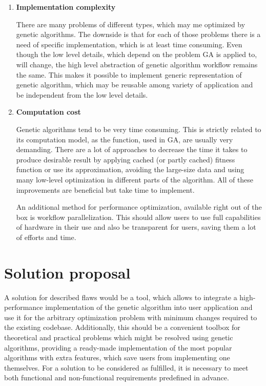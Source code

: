 \begin{enumerate}
\item \textbf{Implementation complexity}

There are many problems of different types, which may me optimized by genetic algorithms. The downside is that for each of those problems there is a need of specific implementation, which is at least time consuming. Even though the low level details, which depend on the problem GA is applied to, will change, the high level abstraction of genetic algorithm workflow remains the same. This makes it possible to implement generic representation of genetic algorithm, which may be reusable among variety of application and be independent from the low level details. 
\medbreak

\item \textbf{Computation cost}

Genetic algorithms tend to be very time consuming. This is strictly related to its computation model, as the function, used in GA, are usually very demanding. There are a lot of approaches to decrease the time it takes to produce desirable result by applying cached (or partly cached) fitness function or use its approximation, avoiding the large-size data and using many low-level optimization in different parts of the algorithm. All of these improvements are beneficial but take time to implement.

An additional method for performance optimization, available right out of the box is workflow parallelization. This should allow users to use full capabilities of hardware in their use and also be transparent for users, saving them a lot of efforts and time.
\medbreak

\end{enumerate}

\section{Solution proposal}

A solution for described flaws would be a tool, which allows to integrate a high-performance implementation of the genetic algorithm into user application and use it for the arbitrary optimization problem with minimum changes required to the existing codebase. Additionally, this should be a convenient toolbox for theoretical and practical problems which might be resolved using genetic algorithms, providing a ready-made implementation of the most popular algorithms with extra features, which save users from implementing one themselves. For a solution to be considered as fulfilled, it is necessary to meet both functional and non-functional requirements predefined in advance.

